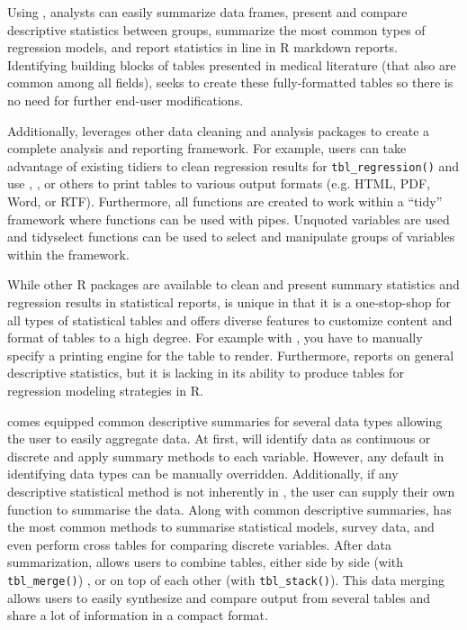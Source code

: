 Using , analysts can easily summarize data frames, present and compare descriptive statistics between groups, summarize the most common types of regression models, and report statistics in line in R markdown reports. 
Identifying building blocks of tables presented in medical literature (that also are common among all fields),  seeks to create these fully-formatted tables so there is no need for further end-user modifications.  

Additionally,  leverages other data cleaning and analysis packages to create a complete analysis and reporting framework.
For example, users can take advantage of existing  tidiers to clean regression results for \texttt{tbl\_regression()} and use , ,  or others to print  tables to various output formats (e.g. HTML, PDF, Word, or RTF).
Furthermore, all  functions are created to work within a “tidy” framework where functions can be used with pipes.
Unquoted variables are used and tidyselect functions can be used to select and manipulate groups of variables within the framework.

While other R packages are available to clean and present summary statistics and regression results in statistical reports,  is unique in that it is a one-stop-shop for all types of statistical tables and offers diverse features to customize content and format of tables to a high degree.
For example with , you have to manually specify a printing engine for the table to render.
Furthermore,  reports on general descriptive statistics, but it is lacking in its ability to produce tables for regression modeling strategies in R. 

 comes equipped common descriptive summaries for several data types allowing the user to easily aggregate data.
At first,  will identify data as continuous or discrete and apply summary methods to each variable. 
However, any default in identifying data types can be manually overridden. 
Additionally, if any descriptive statistical method is not inherently in , the user can supply their own function to summarise the data. 
Along with common descriptive summaries,  has the most common methods to summarise statistical models, survey data, and even perform cross tables for comparing discrete variables. 
After data summarization,  allows users to combine tables, either side by side (with \texttt{tbl\_merge()}) , or on top of each other (with \texttt{tbl\_stack()}). 
This data merging allows users to easily synthesize and compare output from several tables and share a lot of information in a compact format.   

